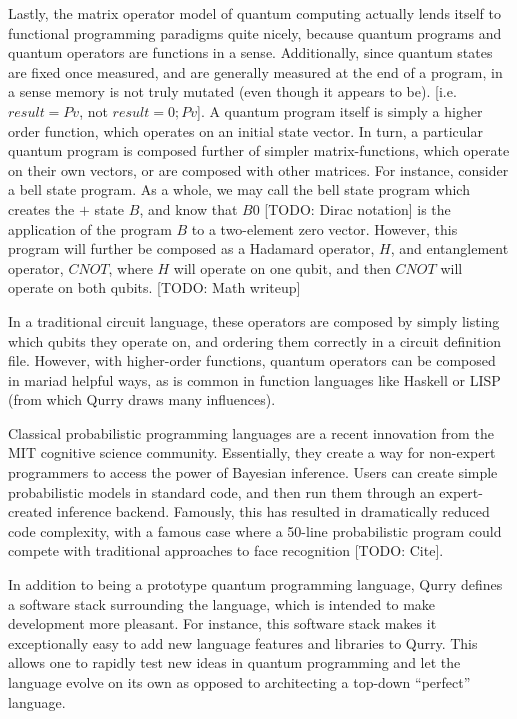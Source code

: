 \documentclass[journal]{IEEEtran}
\begin{document}
Lastly, the matrix operator model of quantum computing actually lends itself to functional programming paradigms quite nicely, because quantum programs and quantum operators are functions in a sense.
Additionally, since quantum states are fixed once measured, and are generally measured at the end of a program, in a sense memory is not truly mutated (even though it appears to be). 
[i.e. $result = Pv$, not $result = 0; Pv$].
A quantum program itself is simply a higher order function, which operates on an initial state vector.
In turn, a particular quantum program is composed further of simpler matrix-functions, which operate on their own vectors, or are composed with other matrices.
For instance, consider a bell state program. 
As a whole, we may call the bell state program which creates the $+$ state $B$, and know that $B 0$ [TODO: Dirac notation] is the application of the program $B$ to a two-element zero vector.
However, this program will further be composed as a Hadamard operator, $H$, and entanglement operator, $CNOT$, where $H$ will operate on one qubit, and then $CNOT$ will operate on both qubits. [TODO: Math writeup]

In a traditional circuit language, these operators are composed by simply listing which qubits they operate on, and ordering them correctly in a circuit definition file.
However, with higher-order functions, quantum operators can be composed in mariad helpful ways, as is common in function languages like Haskell or LISP (from which Qurry draws many influences).

 Classical probabilistic programming languages are a recent innovation from the MIT cognitive science community. 
 Essentially, they create a way for non-expert programmers to access the power of Bayesian inference. 
 Users can create simple probabilistic models in standard code, and then run them through an expert-created inference backend.
 Famously, this has resulted in dramatically reduced code complexity, with a famous case where a 50-line probabilistic program could compete with traditional approaches to face recognition [TODO: Cite].
 

In addition to being a prototype quantum programming language, Qurry defines a software stack surrounding the language, which is intended to make development more pleasant.
For instance, this software stack makes it exceptionally easy to add new language features and libraries to Qurry.
This allows one to rapidly test new ideas in quantum programming and let the language evolve on its own as opposed to architecting a top-down ``perfect'' language.
\end{document}
